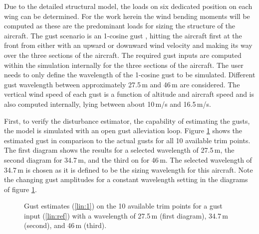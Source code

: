 \documentclass[graybox]{svmult}
\begin{document}
Due to the detailed structural model, the loads on six dedicated position on each wing can be determined. For the work herein the wind bending moments will be computed as these are the predominant loads for sizing the structure of the aircraft.
The gust scenario is an 1-cosine gust \cite{Flomenhoft94,Fuller95}, hitting the aircraft first at the front from either with an upward or downward wind velocity and making its way over the three sections of the aircraft.
The required gust inputs are computed within the simulation internally for the three sections of the aircraft. The user needs to only define the  wavelength of the 1-cosine gust to be simulated.  Different gust wavelength between approximately 27.5\,m and 46\,m are considered. The vertical wind speed of each gust is a function of altitude and aircraft speed and is also computed internally, lying between about 10\,m/s and 16.5\,m/s.

First, to verify the disturbance estimator, the capability of estimating the gusts, the model is simulated with an open gust alleviation loop. Figure \ref{fig:est} shows the estimated gust in comparison to the actual gusts for all 10 available trim points. The first diagram shows the results for a selected wavelength of  27.5\,m, the second diagram for 34.7\,m, and the third on for 46\,m. The selected wavelength of 34.7\,m is chosen as it is defined to be the sizing wavelength for this aircraft. Note the changing gust amplitudes for a constant wavelength setting in the diagrams of figure \ref{fig:est}.

\begin{figure}[hbt]
	\sidecaption[]
	
	\caption{Gust estimates (\ref{lin:1}) on the 10 available trim points for a gust input (\ref{lin:ref}) with a wavelength of 27.5\,m (first diagram), 34.7\,m (second), and 46\,m (third). }
	\label{fig:est}
\end{figure}
\end{document}
